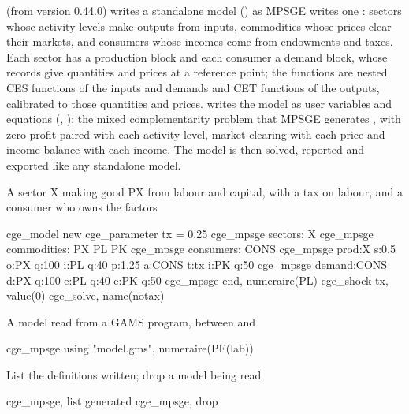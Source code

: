 

 (from version 0.44.0) writes a standalone model
() as MPSGE writes one \citep{rutherford1999}: sectors
whose activity levels make outputs from inputs, commodities whose prices
clear their markets, and consumers whose incomes come from endowments and
taxes. Each sector has a production block and each consumer a demand
block, whose records give quantities and prices at a reference point; the
functions are nested CES functions of the inputs and demands and CET
functions of the outputs, calibrated to those quantities and prices.
 writes the model as user variables and equations
(, ): the mixed complementarity
problem that MPSGE generates \citep{mathiesen1985, rutherford1995}, with zero
profit paired with each activity level, market clearing with each price and
income balance with each income. The model is then solved, reported and
exported like any standalone model.


A sector X making good PX from labour and capital, with a tax on labour,
and a consumer who owns the factors
\begin{stcode}
cge_model new
cge_parameter tx = 0.25
cge_mpsge sectors: X
cge_mpsge commodities: PX PL PK
cge_mpsge consumers: CONS
cge_mpsge prod:X s:0.5  o:PX q:100  i:PL q:40 p:1.25 a:CONS t:tx  i:PK q:50
cge_mpsge demand:CONS   d:PX q:100  e:PL q:40  e:PK q:50
cge_mpsge end, numeraire(PL)
cge_shock tx, value(0)
cge_solve, name(notax)
\end{stcode}
A model read from a GAMS program, between  and 
\begin{stcode}
cge_mpsge using "model.gms", numeraire(PF(lab))
\end{stcode}
List the definitions written; drop a model being read
\begin{stcode}
cge_mpsge, list generated
cge_mpsge, drop
\end{stcode}


